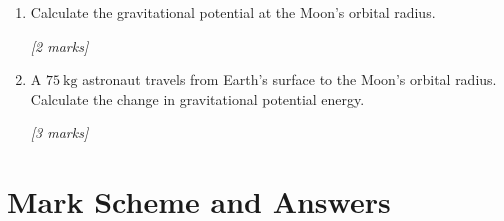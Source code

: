 \begin{tcolorbox}[colback=white, colframe=midblue, breakable]
\begin{minipage}{\linewidth}
\begin{enumerate}[label=(\alph*)]
  \item Calculate the gravitational potential at the Moon's orbital radius.
  \par\hfill\textit{[2 marks]}
  \vspace{3.5cm}

  \item A $75\ \text{kg}$ astronaut travels from Earth's surface to the Moon's orbital radius. Calculate the change in gravitational potential energy.
  \par\hfill\textit{[3 marks]}
  \vspace{4cm}
\end{enumerate}
\end{minipage}

\end{tcolorbox}

\section{Mark Scheme and Answers}

